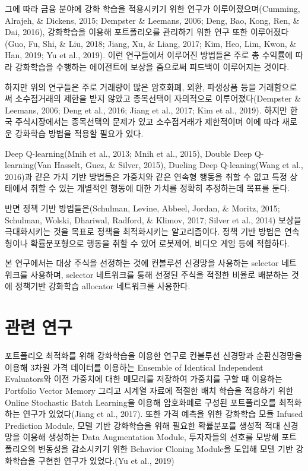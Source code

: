 \documentclass[a4paper]{article}
\begin{document}
그에 따라 금융 분야에 강화 학습을 적용시키기 위한 연구가 이루어졌으며(Cumming, Alrajeh, \& Dickens, 2015; Dempster \& Leemans, 2006; Deng, Bao, Kong, Ren, \& Dai, 2016), 강화학습을 이용해 포트폴리오를 관리하기 위한 연구 또한 이루어졌다(Guo, Fu, Shi, \& Liu, 2018; Jiang, Xu, \& Liang, 2017; Kim, Heo, Lim, Kwon, \& Han, 2019; Yu et al., 2019). 이런 연구들에서 이루어진 방법들은 주로 총 수익률에 따라 강화학습을 수행하는 에이전트에 보상을 줌으로써 피드백이 이루어지는 것이다. 

하지만 위의 연구들은 주로 거래량이 많은 암호화폐, 외환, 파생상품 등을 거래함으로써 소수점거래의 제한을 받지 않았고 종목선택이 자의적으로 이루어졌다(Dempster \& Leemans, 2006; Deng et al., 2016; Jiang et al., 2017; Kim et al., 2019). 하지만 한국 주식시장에서는 종목선택의 문제가 있고 소수점거래가 제한적이며 이에 따라 새로운 강화학습 방법을 적용할 필요가 있다.

Deep Q-learning(Mnih et al., 2013; Mnih et al., 2015), Double Deep Q-learning(Van Hasselt, Guez, \& Silver, 2015), Dueling Deep Q-leaning(Wang et al., 2016)과 같은 가치 기반 방법들은 가중치와 같은 연속형 행동을 취할 수 없고 특정 상태에서 취할 수 있는 개별적인 행동에 대한 가치를 정확히 추정하는데 목표를 둔다.

반면 정책 기반 방법들은(Schulman, Levine, Abbeel, Jordan, \& Moritz, 2015; Schulman, Wolski, Dhariwal, Radford, \& Klimov, 2017; Silver et al., 2014) 보상을 극대화시키는 것을 목표로 정책을 최적화시키는 알고리즘이다. 정책 기반 방법은 연속형이나 확률분포형으로 행동을 취할 수 있어 로봇제어, 비디오 게임 등에 적합하다.

본 연구에서는 대상 주식을 선정하는 것에 컨볼루션 신경망을 사용하는 selector 네트워크를 사용하며, selector 네트워크를 통해 선정된 주식을 적절한 비율로 배분하는 것에 정책기반 강화학습 allocator 네트워크를 사용한다.


\section{관련 연구}
포트폴리오 최적화를 위해 강화학습을 이용한 연구로 컨볼루션 신경망과 순환신경망을 이용해 3차원 가격 데이터를 이용하는 Ensemble of Identical Independent Evaluators와 이전 가중치에 대한 메모리를 저장하여 가중치를 구할 때 이용하는 Portfolio Vector Memory 그리고 시계열 자료에 적절한 배치 학습을 적용하기 위한 Online Stochastic Batch Learning을 이용해 암호화폐로 구성된 포트폴리오를 최적화하는 연구가 있었다(Jiang et al., 2017). 또한 가격 예측을 위한 강화학습 모듈 Infused Prediction Module, 모델 기반 강화학습을 위해 필요한 확률분포를 생성적 적대 신경망을 이용해 생성하는 Data Augmentation Module, 투자자들의 선호를 모방해 포트폴리오의 변동성을 감소시키기 위한 Behavior Cloning Module을 도입해 모델 기반 강화학습을 구현한 연구가 있었다.(Yu et al., 2019)
\end{document}
